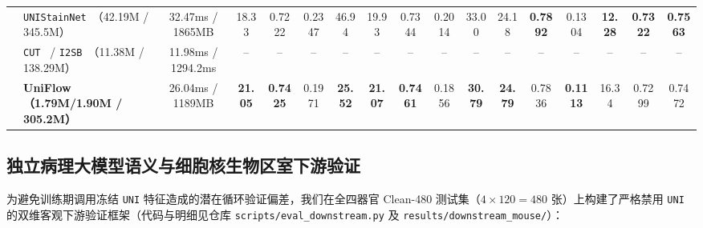\documentclass[journal]{IEEEtran}
\newcommand{\methodname}{UniFlow}
\begin{document}
\begin{table}[!t]
{\begin{tabular}{llc|cccc|cccc|cccccc}
& \texttt{UNIStainNet}~\cite{ref_unistainnet}（42.19M / 345.5M） & 32.47ms / 1865MB & 18.33 & 0.7222 & 0.2347 & 46.94 & 19.93 & 0.7344 & 0.2014 & 33.00 & 24.18 & \textbf{0.7892} & 0.1304 & \textbf{12.28} & \textbf{0.7322} & \textbf{0.7563} \\
& \texttt{CUT}~\cite{ref_cut} / \texttt{I2SB}~\cite{ref_i2sb}（11.38M / 138.29M） & 11.98ms / 1294.2ms & -- & -- & -- & -- & -- & -- & -- & -- & -- & -- & -- & -- & -- & -- \\
& \textbf{\methodname{}（1.79M/1.90M / 305.2M）} & 26.04ms / 1189MB & \textbf{21.05} & \textbf{0.7425} & 0.1971 & \textbf{25.52} & \textbf{21.07} & \textbf{0.7461} & 0.1856 & \textbf{30.79} & \textbf{24.79} & 0.7836 & \textbf{0.1113} & 16.34 & 0.7299 & 0.7472 \\
\bottomrule
\end{tabular}}
\end{table}

\subsection{独立病理大模型语义与细胞核生物区室下游验证}\label{sec:downstream}
为避免训练期调用冻结 \texttt{UNI} 特征造成的潜在循环验证偏差，我们在全四器官 Clean-480 测试集（$4\times 120=480$ 张）上构建了严格禁用 \texttt{UNI} 的双维客观下游验证框架（代码与明细见仓库 \texttt{scripts/eval\_downstream.py} 及 \texttt{results/downstream\_mouse/}）：
\end{document}
